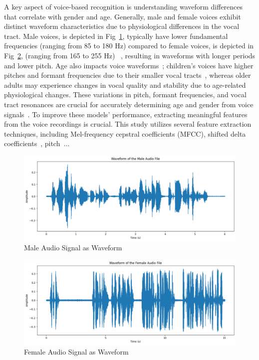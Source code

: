 \documentclass[conference, 10pt,onecolumn]{IEEEtran}
\begin{document}
A key aspect of voice-based recognition is understanding waveform differences that correlate with gender and age. Generally, male and female voices exhibit distinct waveform characteristics due to physiological differences in the vocal tract. Male voices, is depicted in Fig~\ref{fig:Dataset-Male}, typically have lower fundamental frequencies (ranging from 85 to 180 Hz) compared to female voices, is depicted in Fig~\ref{fig:Dataset-Female}, (ranging from 165 to 255 Hz) ~\cite{hanson1999glottal}, resulting in waveforms with longer periods and lower pitch. Age also impacts voice waveforms~\cite{dehqan2013effects}; children's voices have higher pitches and formant frequencies due to their smaller vocal tracts~\cite{lee1999acoustics}, whereas older adults may experience changes in vocal quality and stability due to age-related physiological changes. These variations in pitch, formant frequencies, and vocal tract resonances are crucial for accurately determining age and gender from voice signals~\cite{kent1992acoustic}. To improve these models' performance, extracting meaningful features from the voice recordings is crucial. This study utilizes several feature extraction techniques, including Mel-frequency cepstral coefficients (MFCC), shifted delta coefficients~\cite{torres2002approaches}, pitch~\cite{yang2016pitch}...


\begin{figure}
    \centering
    \includegraphics[width=4 in]{Dataset-Male.png}
    \caption{Male Audio Signal as Waveform}
    \label{fig:Dataset-Male}
\end{figure}

\begin{figure}
    \centering
    \includegraphics[width=4 in]{Dataset-Female.png}
    \caption{Female Audio Signal as Waveform}
    \label{fig:Dataset-Female}
\end{figure}
\end{document}
